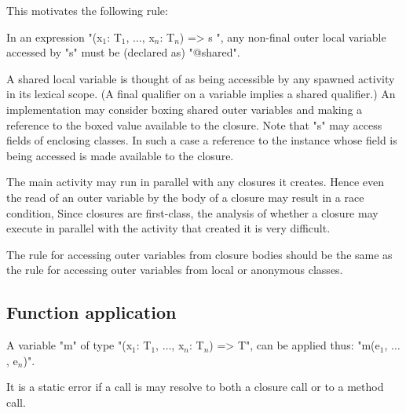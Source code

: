 This motivates the following rule:

\begin{staticrule*}
In an expression
\xcdmath"(x$_1$: T$_1$, $\dots$, x$_n$: T$_n$) => { s }",
any non-final outer local variable accessed by \xcd"s" must be (declared
as) \xcd"@shared".
\end{staticrule*}

A shared local variable is thought of as being accessible by any spawned
activity in its lexical scope. (A final qualifier on a variable implies
a shared qualifier.) An implementation may consider boxing shared outer
variables and making a reference to the boxed value available to the
closure. Note that \xcd"s" may access fields of enclosing classes. In such a
case a reference to the instance whose field is being accessed is made
available to the closure.

\begin{note}
The main activity may run in parallel with any
closures it creates. Hence even the read of an outer variable by the
body of a closure may result in a race condition, Since closures are
first-class, the analysis of whether a closure may execute in parallel
with the activity that created it is very difficult.
\end{note}

\begin{note}
The rule for accessing outer variables from closure bodies
should be the same as the rule for accessing outer variables from local
or anonymous classes.
\end{note}

\subsection{Function application}

A variable \xcd"m" of type
\xcdmath"(x$_1$: T$_1$, $\dots$, x$_n$: T$_n$) => T",
can be applied thus:
\xcdmath"m(e$_1$, $\dots$, e$_n$)".

It is a static error if a call is may resolve to both a closure call or
to a method call.


